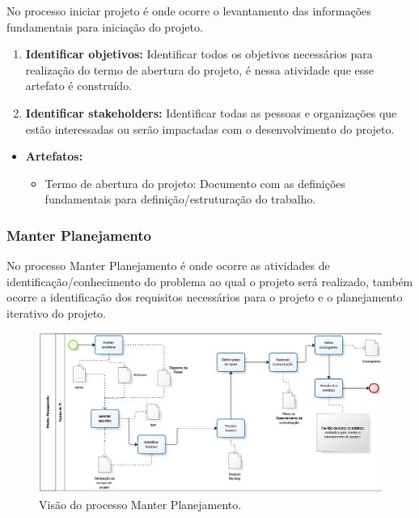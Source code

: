 No processo iniciar projeto é onde ocorre o levantamento das informações fundamentais para iniciação do projeto. 

\begin{enumerate}
	\item \textbf{Identificar objetivos:} 
		Identificar todos os objetivos necessários para realização do termo de abertura do projeto, é nessa atividade que esse artefato é construído.
	\item \textbf{Identificar stakeholders:}
		Identificar todas as pessoas e organizações que estão interessadas ou serão impactadas com o desenvolvimento do projeto. 
\end{enumerate}

\begin{itemize}
	\item \textbf{Artefatos:}
		\begin{itemize}
		\item Termo de abertura do projeto: Documento com as definições fundamentais para definição/estruturação do trabalho. 
		\end{itemize}
\end{itemize}

\subsubsection{Manter Planejamento}

No processo Manter Planejamento é onde ocorre as atividades de identificação/conhecimento do problema ao qual o projeto será realizado, também ocorre a identificação dos requisitos necessários para o projeto e o planejamento iterativo do projeto. 

\begin{landscape}
\begin{figure}[H]
	\centering
	\label{Visão do processo Manter Planejamento}
		\includegraphics[keepaspectratio=true,scale=0.9,angle=360]{processo/manterPlanejamento.png}
	\caption{Visão do processo Manter Planejamento.}
\end{figure}
\end{landscape}

